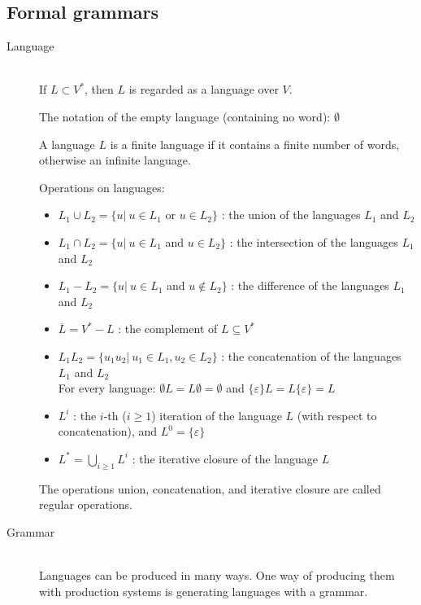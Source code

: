 \documentclass[margin=0px]{article}
\begin{document}
\subsection{Formal grammars}
\begin{description}
    \item[Language] \hfill \\
        If $L \subset V^*$, then $L$ is regarded as a language over $V$.

        The notation of the empty language (containing no word): $\emptyset$

        A language $L$ is a finite language if it contains a finite number of words, otherwise an infinite language.

        Operations on languages:
        \begin{itemize}
            \item $ L_1 \cup L_2 = \{u | \ u \in L_1 $ or $ u \in L_2\}$ : the union of the languages $L_1$ and $L_2$
            \item $ L_1 \cap L_2 = \{u | \ u \in L_1 $ and $ u \in L_2\}$ : the intersection of the languages $L_1$ and $L_2$
            \item $ L_1 - L_2 = \{u | \ u \in L_1 $ and $ u \notin L_2\}$ : the difference of the languages $L_1$ and $L_2$
            \item $\overline{L} = V^* - L$ : the complement of $L \subseteq V^*$
            \item $L_1L_2 = \{u_1u_2 | \ u_1 \in L_1, u_2 \in L_2\}$ : the concatenation of the languages $L_1$ and $L_2$\\
                  For every language: $\emptyset L = L \emptyset = \emptyset$ and $\{\varepsilon\}L = L\{\varepsilon\} = L$
            \item $L^i$ : the $i$-th ($i \geq 1$) iteration of the language $L$ (with respect to concatenation), and $L^0 = \{\varepsilon\}$
            \item $ L^* = \bigcup\limits_{i\geq1} L^i$ : the iterative closure of the language $L$
        \end{itemize}
        The operations union, concatenation, and iterative closure are called regular operations.
    \item[Grammar] \hfill \\
        Languages can be produced in many ways. One way of producing them with production systems is generating languages with a grammar.


\end{description}
\end{document}
